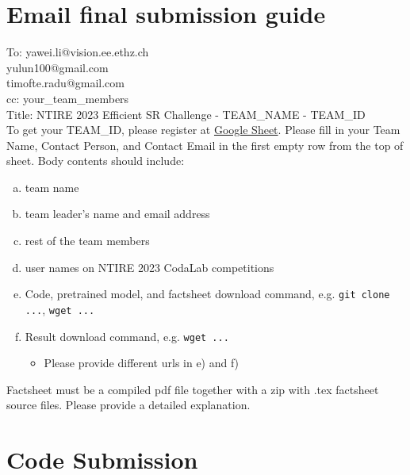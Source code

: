 \documentclass[10pt,twocolumn,letterpaper]{article}
\begin{document}
\section{Email final submission guide}

\noindent To: {yawei.li@vision.ee.ethz.ch} \\ {yulun100@gmail.com} \\ {timofte.radu@gmail.com}\\
\noindent cc: your\_team\_members\\
Title: NTIRE 2023 Efficient SR Challenge - TEAM\_NAME - TEAM\_ID\\

To get your TEAM\_ID, please register at \href{https://docs.google.com/spreadsheets/d/1oekPThh5mq9qKax0hPZiQSHlqTjaoQa-IBfrQkwN7gk/edit?usp=sharing}{Google Sheet}. Please fill in your Team Name, Contact Person, and Contact Email in the first empty row from the top of sheet.
% 
Body contents should include: 

\begin{enumerate}[a)]
\item team name 

\item team leader's name and email address 

\item rest of the team members 

\item user names on NTIRE 2023 CodaLab competitions 

\item Code, pretrained model, and factsheet download command, e.g. \texttt{git clone ...}, \texttt{wget ...}

\item Result download command, e.g. \texttt{wget ...}
\begin{itemize}
    \item Please provide different urls in e) and f)
\end{itemize}
\end{enumerate}



\noindent Factsheet must be a compiled pdf file together with a zip with .tex factsheet source files. Please provide a detailed explanation.


\section{Code Submission}
\end{document}
